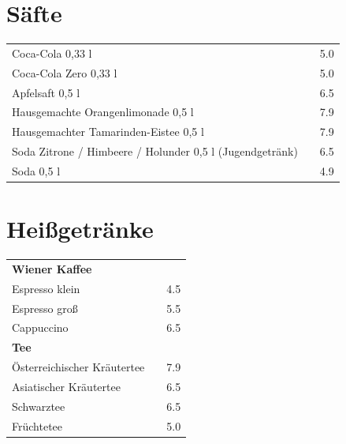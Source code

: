 \documentclass[a4paper,12pt]{article}
\begin{document}
\small
\titlespacing*{\section}{0pt}{0.45em}{0.25em}
\setlength{\columnsep}{0.7cm}
\begin{multicols}{2}

\section*{Säfte}
\begin{tabular}{Lrr}
Coca-Cola 0,33 l & & 5.0\\
Coca-Cola Zero 0,33 l & & 5.0\\
Apfelsaft 0,5 l & & 6.5\\
Hausgemachte Orangenlimonade 0,5 l & & 7.9\\
Hausgemachter Tamarinden-Eistee 0,5 l & & 7.9\\
Soda Zitrone / Himbeere / Holunder 0,5 l (Jugendgetränk) & & 6.5\\
Soda 0,5 l & & 4.9
\end{tabular}

\section*{Heißgetränke}
\begin{tabular}{Lrr}
\textbf{Wiener Kaffee}\\
\hspace{0.4cm}Espresso klein & & 4.5\\
\hspace{0.4cm}Espresso groß & & 5.5\\
\hspace{0.4cm}Cappuccino & & 6.5\vspace{0.1cm}\\
\textbf{Tee}\\
\hspace{0.4cm}Österreichischer Kräutertee & & 7.9\\
\hspace{0.4cm}Asiatischer Kräutertee & & 6.5\\
\hspace{0.4cm}Schwarztee & & 6.5\\
\hspace{0.4cm}Früchtetee & & 5.0
\end{tabular}


\end{multicols}
\end{document}
